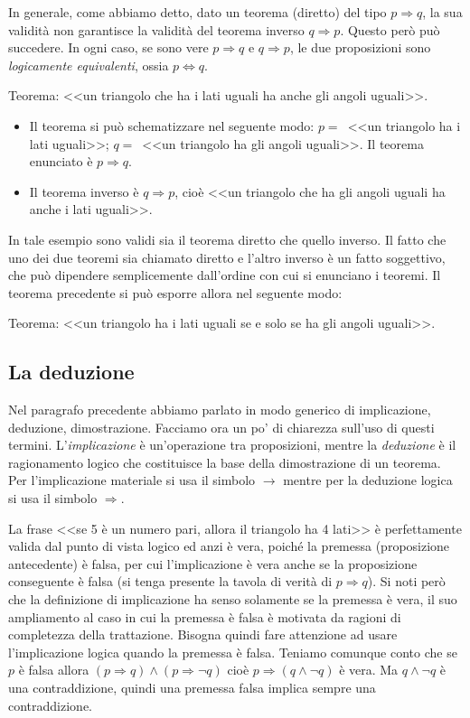 In generale, come abbiamo detto, dato un teorema (diretto) del tipo $p\Rightarrow q$, la sua validità non garantisce la validità del teorema inverso $q\Rightarrow p$. Questo però può succedere. In ogni caso, se sono vere $p\Rightarrow q$ e $q\Rightarrow p$, le due proposizioni sono \emph{logicamente equivalenti}, ossia $p\Leftrightarrow q$.
\begin{exrig}
\begin{esempio}
Teorema: <<un triangolo che ha i lati uguali ha anche gli angoli uguali>>.
\begin{itemize}
\item Il teorema si può schematizzare nel seguente modo: $p=$~<<un triangolo ha i lati uguali>>; $q=$~<<un triangolo ha gli angoli uguali>>. Il teorema enunciato è $p\Rightarrow q$.
\item  Il teorema inverso è  $q\Rightarrow p$, cioè <<un triangolo che ha gli angoli uguali ha anche i lati uguali>>.
\end{itemize}
In tale esempio sono validi sia il teorema diretto che quello inverso. Il fatto che uno dei due teoremi sia chiamato diretto e l'altro inverso è un fatto soggettivo, che può dipendere semplicemente dall'ordine con cui si enunciano i teoremi.
Il teorema precedente si può esporre allora nel seguente modo:
\item Teorema: <<un triangolo ha i lati uguali se e solo se ha gli angoli uguali>>.
\end{esempio}
\end{exrig}

\subsection{La deduzione}

Nel paragrafo precedente abbiamo parlato in modo generico di implicazione, deduzione, dimostrazione. Facciamo ora un po' di chiarezza sull'uso di questi termini. L'\emph{implicazione} è un'operazione tra proposizioni, mentre la \emph{deduzione} è il ragionamento logico che costituisce la base della dimostrazione di un teorema. Per l'implicazione materiale si usa il simbolo $\rightarrow$ mentre per la deduzione logica si usa il simbolo $\Rightarrow$.

La frase <<se 5 è un numero pari, allora il triangolo ha 4 lati>> è perfettamente valida dal punto di vista logico ed anzi è vera, poiché la premessa (proposizione antecedente) è falsa, per cui l'implicazione è vera anche se la proposizione conseguente è falsa (si tenga presente la tavola di verità di $p\Rightarrow q$).
Si noti però che la definizione di implicazione ha senso solamente se la premessa è vera, il suo ampliamento al caso in cui la premessa è falsa è motivata da ragioni di completezza della trattazione. Bisogna quindi fare attenzione ad usare l'implicazione logica quando la premessa è falsa. Teniamo comunque conto che se $p$ è falsa allora $(p\Rightarrow q)\wedge(p\Rightarrow \neg q)$ cioè $p\Rightarrow (q\wedge \neg q)$ è vera. Ma  $q\wedge \neg q$ è una contraddizione, quindi una premessa falsa implica sempre una contraddizione.

